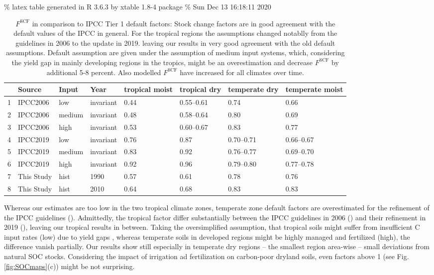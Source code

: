 \documentclass[gc, manuscript]{copernicus}
\begin{document}
\% latex table generated in R 3.6.3 by xtable 1.8-4 package
\% Sun Dec 13 16:18:11 2020

\begin{table}[ht]
\centering
\begin{tabular}{rlllllll}
  \hline
 & Source & Input & Year & tropical moist & tropical dry & temperate dry & temperate moist \\ 
  \hline
1 & IPCC2006 & low & invariant & 0.44 & 0.55--0.61 & 0.74 & 0.66 \\ 
  2 & IPCC2006 & medium & invariant & 0.48 & 0.58--0.64 & 0.80 & 0.69 \\ 
  3 & IPCC2006 & high & invariant & 0.53 & 0.60--0.67 & 0.83 & 0.77 \\ 
  4 & IPCC2019 & low & invariant & 0.76 & 0.87 & 0.70--0.71 & 0.66--0.67 \\ 
  5 & IPCC2019 & medium & invariant & 0.83 & 0.92 & 0.76--0.77 & 0.69--0.70 \\ 
  6 & IPCC2019 & high & invariant & 0.92 & 0.96 & 0.79--0.80 & 0.77--0.78 \\ 
  7 & This Study & hist & 1990 & 0.57 & 0.61 & 0.78 & 0.76 \\ 
  8 & This Study & hist & 2010 & 0.64 & 0.68 & 0.83 & 0.83 \\ 
   \hline
\end{tabular}
\caption{$F^{\mathrm{SCF}}$ in comparison to IPCC Tier 1 default factors: Stock change factors are in good agreement with the default values of the IPCC in general. For the tropical regions the assumptions changed notablly from the guidelines in 2006 to the update in 2019. leaving our results in very good agreement with the old default assumptions. Default assumption are given under the assumption of medium input systems, which, considering the yield gap in mainly developing regions in the tropics, might be an overestimation and decrease $F^{\mathrm{SCF}}$ by additional 5-8 percent. Also modelled $F^{\mathrm{SCF}}$ have increased for all climates over time.} 
\end{table}

Whereas our estimates are too low in the two tropical climate zones, temperate zone default factors are overestimated for the refinement of the IPCC guidelines (\citep{calvo_buendia_ipcc_2019}). Admittedly, the tropical factor differ substantially between the IPCC guidelines in 2006 (\citep{eggleston_ipcc_2006}) and their refinement in 2019 (\citep{calvo_buendia_ipcc_2019}), leaving our tropical results in between.
Taking the oversimplified assumption, that tropical soils might suffer from insufficient C input rates (low) due to yield gaps , whereas temperate soils in developed regions might be highly managed and fertilized (high), the difference vanish partially. Our results show still especially in temperate dry regions -- the smallest region area-wise -- small deviations from natural SOC stocks. Considering the impact of irrigation ad fertilization on carbon-poor dryland soils, even factors above 1 (see Fig. \ref{fig:SOCmaps}(c)) might be not surprising.
\end{document}
